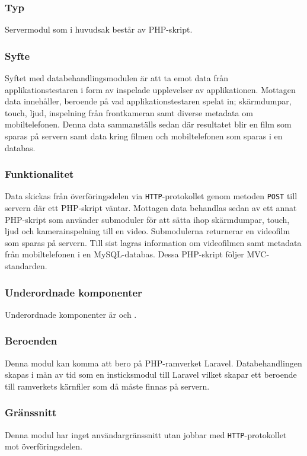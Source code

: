 \subsubsection{Typ}
Servermodul som i huvudsak består av PHP-skript.

\subsubsection{Syfte}
Syftet med databehandlingsmodulen är att ta emot data från applikationstestaren i form av inspelade upplevelser av applikationen. Mottagen data innehåller, beroende på vad applikationstestaren spelat in; skärmdumpar, touch, ljud, inspelning från frontkameran samt diverse metadata om mobiltelefonen. Denna data sammanställs sedan där resultatet blir en film som sparas på servern samt data kring filmen och mobiltelefonen som sparas i en databas.

\subsubsection{Funktionalitet}
Data skickas från överföringsdelen via \texttt{HTTP}-protokollet genom metoden \texttt{POST} till servern där ett PHP-skript väntar. Mottagen data behandlas sedan av ett annat PHP-skript som använder submoduler för att sätta ihop skärmdumpar, touch, ljud och kamerainspelning till en video. Submodulerna returnerar en videofilm som sparas på servern. Till sist lagras information om videofilmen samt metadata från mobiltelefonen i en MySQL-databas. Dessa PHP-skript följer MVC-standarden.

\subsubsection{Underordnade komponenter}
Underordnade komponenter är  och .

\subsubsection{Beroenden}
Denna modul kan komma att bero på PHP-ramverket Laravel. Databehandlingen skapas i mån av tid som en insticksmodul till Laravel vilket skapar ett beroende till ramverkets kärnfiler som då måste finnas på servern.

\subsubsection{Gränssnitt}
Denna modul har inget användargränssnitt utan jobbar med \texttt{HTTP}-protokollet mot överföringsdelen.

